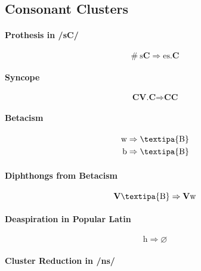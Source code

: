 \documentclass{report}
\begin{document}
\subsection{Consonant Clusters}

\paragraph{Prothesis in /sC/}

\begin{equation}
  \#\ \text{s}\textbf{C} \Rightarrow \text{es}.\textbf{C}
\end{equation}

\paragraph{Syncope}

\begin{equation}
  \textbf{CV.C} \Rightarrow \textbf{CC}
\end{equation}

\paragraph{Betacism}

\begin{align}
\text{w} & \Rightarrow \text{\textipa{B}} \\
\text{b} & \Rightarrow \text{\textipa{B}}
\end{align}

\paragraph{Diphthongs from Betacism}

\begin{equation}
\textbf{V}\text{\textipa{B}} \Rightarrow \textbf{V}\text{w}
\end{equation}

\paragraph{Deaspiration in Popular Latin}

\begin{equation}
  \text{h} \Rightarrow \varnothing
\end{equation}

\paragraph{Cluster Reduction in /ns/}
\end{document}
